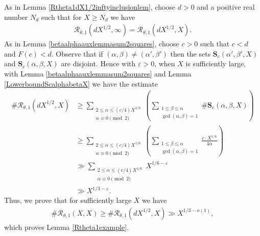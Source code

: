 \documentclass[12pt]{amsart}
\newcommand{\1}{\mathmybb{1}}
\begin{document}
As in Lemma \ref{Rtheta1dX1/2inftyinclusionlem}, choose $d>0$ and a positive real number $N_{d}$ such that for $X \geq N_{d}$ we have
\begin{align*}
\mathcal{R}_{\theta,1}(d X^{1/2},\infty) =  \mathcal{R}_{\theta,1}(d X^{1/2},X).
\end{align*}
As in Lemma \ref{betaalphaauxlemmasum2squares}, choose $c>0$ such that $c < d$ and $F(c) < d$. Observe that if $(\alpha,\beta) \neq (\alpha',\beta')$ then the sets $\mathbf{S}_{c}(\alpha',\beta',X)$ and $\mathbf{S}_{c}(\alpha,\beta,X)$ are disjoint. Hence with $\varepsilon > 0$, when $X$ is sufficiently large, with Lemma \ref{betaalphaauxlemmasum2squares} and Lemma \ref{LowerboundScalphabetaX} we have the estimate
\begin{align*}
\# \mathcal{R}_{\theta,1}(d X^{1/2},X) &\geq \sum_{\substack{2 \leq \alpha \leq (c/4)X^{1/6} \\ \alpha \equiv 0 \pmod 2}}\left(\sum_{\substack{1\leq \beta \leq \alpha \\ \gcd(\alpha,\beta) = 1}}\#\mathbf{S}_{c}(\alpha,\beta,X)\right)\\
&\geq \sum_{\substack{2 \leq \alpha \leq (c/4)X^{1/6} \\ \alpha \equiv 0 \pmod 2}}\left(\sum_{\substack{1\leq \beta \leq \alpha \\ \gcd(\alpha,\beta) = 1}}\frac{c\cdot X^{1/6}}{4\alpha}\right)\\
&\gg \sum_{\substack{2 \leq \alpha \leq (c/4)X^{1/6} \\ \alpha \equiv 0 \pmod 2}}X^{1/6-\varepsilon}\\
&\gg X^{1/3-\varepsilon}.
\end{align*}
Thus, we prove that for sufficiently large $X$ we have
\begin{align*}
\#\mathcal{R}_{\theta,1}(X,X) \geq \#\mathcal{R}_{\theta,1}(dX^{1/2},X)\gg X^{1/3-o(1)},
\end{align*}
which proves Lemma \ref{Rtheta1example}.
\end{document}
